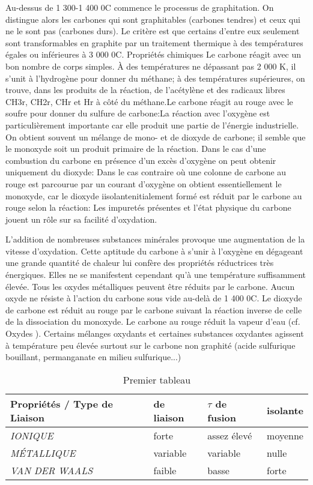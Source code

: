 \documentclass[a4 paper, 10 pt]{article}
\begin{document}
 Au-dessus de 1 300-1 400 0C commence le processus de graphitation. On
distingue alors les carbones qui sont graphitables (carbones tendres)
et ceux qui ne le sont pas (carbones durs). Le critère est que
certains d'entre eux seulement sont transformables en graphite par un
traitement thermique à des températures égales ou
inférieures à 3 000 0C.  Propriétés chimiques Le
carbone réagit avec un bon nombre de corps simples. À des
températures ne dépassant pas 2 000 K, il s'unit à
l'hydrogène pour donner du méthane; à des températures
supérieures, on trouve, dans les produits de la réaction, de
l'acétylène et des radicaux libres CH3r, CH2r, CHr et Hr à
côté du méthane.Le carbone réagit au rouge avec le soufre
pour donner du sulfure de carbone:La réaction avec l'oxygène est
particulièrement importante car elle produit une partie de
l'énergie industrielle. On obtient souvent un mélange de
mono- et de dioxyde de carbone; il semble que le monoxyde soit un
produit primaire de la réaction. Dans le cas d'une combustion du
carbone en présence d'un excès d'oxygène on peut obtenir
uniquement du dioxyde: Dans le cas contraire où une colonne de
carbone au rouge est parcourue par un courant d'oxygène on obtient
essentiellement le monoxyde, car le dioxyde iisolantenitialement formé est
réduit par le carbone au rouge selon la réaction: Les
impuretés présentes et l'état physique du carbone jouent un
rôle sur sa facilité d'oxydation. \newline 

L'addition de nombreuses
substances minérales provoque une augmentation de la vitesse
d'oxydation. Cette aptitude du carbone à s'unir à l'oxygène
en dégageant une grande quantité de chaleur lui confère des
propriétés réductrices très énergiques. Elles ne se
manifestent cependant qu'à une température suffisamment
élevée. Tous les oxydes métalliques peuvent être
réduits par le carbone. Aucun oxyde ne résiste à l'action du
carbone sous vide au-delà de 1 400 0C. Le dioxyde de carbone
est réduit au rouge par le carbone suivant la réaction inverse
de celle de la dissociation du monoxyde. Le carbone au rouge réduit
la vapeur d'eau (cf. Oxydes ). Certains mélanges oxydants et
certaines substances oxydantes agissent à température peu
élevée surtout sur le carbone non graphité (acide sulfurique
bouillant, permanganate en milieu sulfurique...)  

\begin{table}[h] 
\begin{tabular}{|l|l|l|l|} \hline
	\textbf{Propriétés / Type de Liaison} & de liaison & $\tau$  de fusion & isolante \\ \hline
	\textit{IONIQUE} & forte & assez élevé & moyenne \\ \hline
	\textit{MÉTALLIQUE} & variable & variable & nulle \\ \hline
	\textit{VAN DER WAALS} & faible & basse & forte \\ \hline
\end{tabular}
	\caption{Premier tableau}
\end{table}
\end{document}
